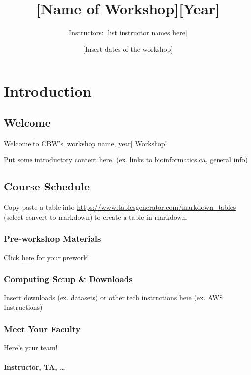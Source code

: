 \documentclass[
]{book}
\title{{[}Name of Workshop{]}{[}Year{]}}
\author{Instructors: {[}list instructor names here{]}}
\date{{[}Insert dates of the workshop{]}}
\begin{document}
\maketitle

{
\setcounter{tocdepth}{1}
\tableofcontents
}
\part{Introduction}\label{part-introduction}

\chapter{Welcome}\label{welcome}

Welcome to CBW's {[}workshop name, year{]} Workshop!

Put some introductory content here. (ex. links to bioinformatics.ca, general info)

\chapter{Course Schedule}\label{course-schedule}

Copy paste a table into \url{https://www.tablesgenerator.com/markdown_tables} (select convert to markdown) to create a table in markdown.

\section{Pre-workshop Materials}\label{pre-workshop-materials}

Click \href{insert\%20link\%20here}{here} for your prework!

\section{Computing Setup \& Downloads}\label{computing-setup-downloads}

Insert downloads (ex. datasets) or other tech instructions here (ex. AWS Instructions)

\section{Meet Your Faculty}\label{meet-your-faculty}

Here's your team!

\subsection{Instructor, TA, \ldots{}}\label{instructor-ta}
\end{document}
